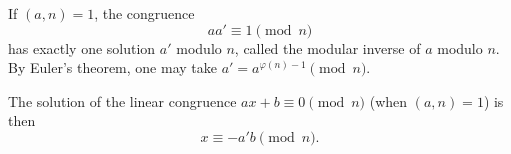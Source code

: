If $(a, n) = 1$, the congruence
$$a a' \equiv 1 \pmod{n}$$
has exactly one solution $a'$ modulo $n$, called the modular inverse of $a$ modulo $n$. By Euler's theorem, one may take $a' = a^{\varphi(n)-1} \pmod{n}$.

The solution of the linear congruence $ax + b \equiv 0 \pmod{n}$ (when $(a,n)=1$) is then
$$x \equiv -a' b \pmod{n}.$$
